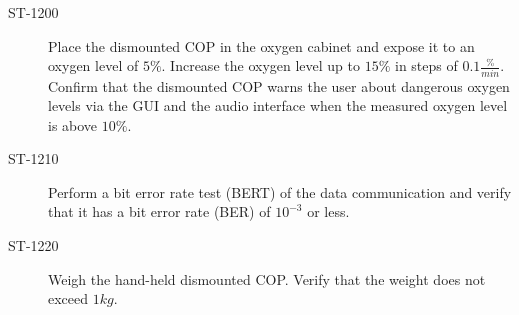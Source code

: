 \begin{description}
\item[ST-1200] Place the dismounted COP in the oxygen cabinet and expose it to an oxygen level of $5\%$. Increase the oxygen level up to $15\%$ in steps of $0.1\frac{\%}{min}$. Confirm that the dismounted COP warns the user about dangerous oxygen levels via the GUI and the audio interface when the measured oxygen level is above $10\%$. 

\item[ST-1210] Perform a bit error rate test (BERT) of the data communication and verify that it has a bit error rate (BER) of $10^{-3}$ or less. 

\item[ST-1220] Weigh the hand-held dismounted COP. Verify that the weight does not exceed $1kg$. 

\end{description}


